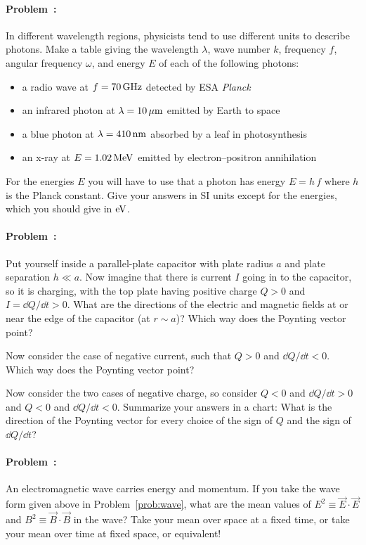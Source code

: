 \documentclass[12pt]{article}
\begin{document}
\paragraph{Problem~\theproblem:}%
In different wavelength regions, physicists tend to use different
units to describe photons. Make a table giving the wavelength
$\lambda$, wave number $k$, frequency $f$, angular frequency $\omega$,
and energy $E$ of each of the following photons:
\begin{itemize}
\item a radio wave at $f=70\,\mathrm{GHz}$ detected by ESA \textsl{Planck}
\item an infrared photon at $\lambda=10\,\mathrm{\mu m}$ emitted by Earth to space
\item a blue photon at $\lambda=410\,\mathrm{nm}$ absorbed by a leaf in photosynthesis
\item an x-ray at $E=1.02\,\mathrm{MeV}$ emitted by electron--positron annihilation
\end{itemize}
For the energies $E$ you will have to use that a photon has energy $E=h\,f$
where $h$ is the Planck constant. Give your answers in SI units except for the
energies, which you should give in $\mathrm{eV}$.

\paragraph{Problem~\theproblem:}%
Put yourself inside a parallel-plate capacitor with plate radius $a$
and plate separation $h\ll a$. Now imagine that there is current $I$
going in to the capacitor, so it is charging, with the top plate having
positive charge $Q>0$ and $I = \dd Q/\dd t > 0$. What are the directions
of the electric and magnetic fields at or near the edge of the capacitor
(at $r\sim a$)? Which way does the Poynting vector point?

Now consider the case of negative current, such that $Q>0$ and $\dd
Q/\dd t<0$. Which way does the Poynting vector point?

Now consider the two cases of negative charge, so consider $Q<0$ and
$\dd Q/\dd t>0$ and $Q<0$ and $\dd Q/\dd t<0$. Summarize your answers
in a chart: What is the direction of the Poynting vector for every
choice of the sign of $Q$ and the sign of $\dd Q/\dd t$?

\paragraph{Problem~\theproblem:}%
An electromagnetic wave carries energy and momentum. If you take the
wave form given above in Problem~\ref{prob:wave}, what are the mean
values of $E^2\equiv\vec{E}\cdot\vec{E}$ and
$B^2\equiv\vec{B}\cdot\vec{B}$ in the wave? Take your mean over space at
a fixed time, or take your mean over time at fixed space, or equivalent!
\end{document}
